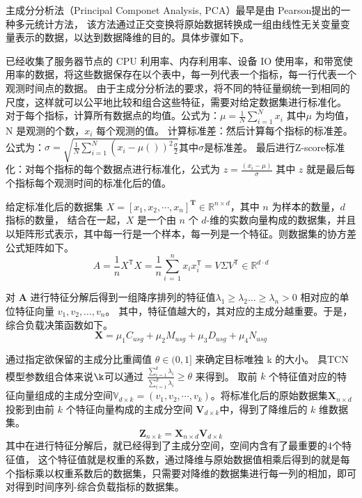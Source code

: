 主成分分析法（Principal Componet Analysis, PCA）最早是由 Pearson\cite{kpfrs1901lines}提出的一种多元统计方法，
该方法通过正交变换将原始数据转换成一组由线性无关变量变量表示的数据，以达到数据降维的目的\cite{李可佳2023基于主成分分析和函数机制的差分隐私线性回归算法}。具体步骤如下。

已经收集了服务器节点的 CPU 利用率、内存利用率、设备 IO 使用率，和带宽使用率的数据，将这些数据保存在以个表中，每一列代表一个指标，每一行代表一个观测时间点的数据。
由于主成分分析法的要求，将不同的特征量纲统一到相同的尺度，这样就可以公平地比较和组合这些特征，需要对给定数据集进行标准化。
对于每个指标，计算所有数据点的均值。公式为：$\mu=\frac{1}{N}\sum_{i=1}^{N}x_{i}$ 其中$\mu$ 为均值，N 是观测的个数，$x_{i}$ 每个观测的值。
计算标准差：然后计算每个指标的标准差。公式为：$\sigma = \sqrt{\frac{1}{N} \sum_{i = 1}^{N} \left(\right. x_{i} - \mu \left(\left.\right)\right)^{2}\frac{\sigma}{2}}$其中$\sigma$是标准差。
最后进行Z-score标准化：对每个指标的每个数据点进行标准化，公式为 $z = \frac{(x_{i} - \mu)}{\sigma}$ 其中 $z$ 就是最后每个指标每个观测时间的标准化后的值。

给定标准化后的数据集 $X = [x_1, x_2, \cdots, x_n]^{\mathbf{T}} \in \mathbb{R}^{n \times d}$，其中 $n$ 为样本的数量，$d$ 指标的数量，
结合在一起，\( X \) 是一个由 \( n \) 个 \( d \)-维的实数向量构成的数据集，并且以矩阵形式表示，其中每一行是一个样本，每一列是一个特征。则数据集的协方差公式矩阵如下。
\begin{equation}
  A={\frac{1}{n}}X^{\mathsf{T}}X={\frac{1}{n}}\sum_{i\,=\,1}^{n}x_{i}x_{i}^{\mathsf{T}}=V\Sigma V^{\mathsf{T}}\in\mathbb{R}^{d\cdot d}
\end{equation}

对 $\mathbf{A}$ 进行特征分解后得到一组降序排列的特征值$\lambda_1 \ge \lambda_2 ... \ge \lambda_n > 0$ 相对应的单位特征向量 $v_1, v_2, \dots, v_n$。
其中，特征值越大的，其对应的主成分越重要。于是，综合负载决策函数如下。
\begin{equation}
  \mathbf{X} = \mu_1C_{usg} + \mu_2M_{usg} + \mu_3D_{usg} + \mu_4N_{usg}
\end{equation}

通过指定欲保留的主成分比重阈值 $\theta \in (0, 1]$ 来确定目标唯独 k 的大小。
具TCN 模型参数组合体来说$\k$可以通过 $\frac{\sum^{k}_{i = 1}\lambda_i}{\sum^{d}_{i = 1}\lambda_i} \ge \theta$ 来得到。
取前 $k$ 个特征值对应的特征向量组成的主成分空间$\mathbb{V}_{d \times k} = (v_1, v_2, \cdots, v_k)$。将标准化后的原始数据集$\mathbf{X}_{n \times d}$ 投影到由前 $k$ 个特征向量构成的主成分空间 $\mathbf{V}_{d \times k}$中，得到了降维后的 $k$ 维数据集。
\begin{equation}
  \mathbf{Z}_{n \times k} = \mathbf{X}_{n \times d}\mathbf{V}_{d \times k}
\end{equation}
其中在进行特征分解后，就已经得到了主成分空间，空间内含有了最重要的4个特征值，
这个特征值就是权重的系数，通过降维与原始数据值相乘后得到的就是每个指标乘以权重系数后的数据集，只需要对降维的数据集进行每一列的相加，即可对得到时间序列-综合负载指标的数据集。

